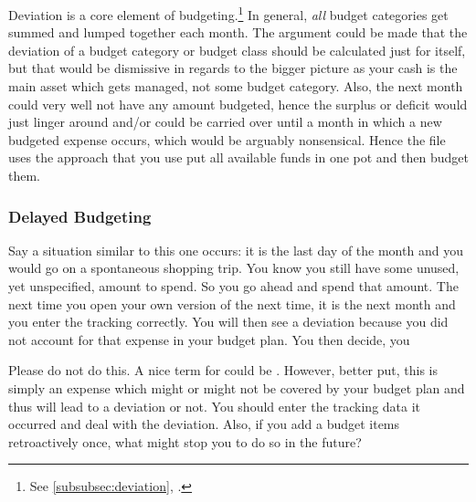 Deviation is a core element of budgeting.\footnote{See \autoref{subsubsec:deviation}, .}
In general, \emph{all} budget categories get summed and lumped together each month.
The argument could be made that the deviation of a budget category or budget class should be calculated just for itself, but that would be dismissive in regards to the bigger picture as your cash is the main asset which gets managed, not some budget category.
Also, the next month could very well not have any amount budgeted, hence the surplus or deficit would just linger around and/or could be carried over until a month in which a new budgeted expense occurs, which would be arguably nonsensical.
Hence the file uses the approach that you use put all available funds in one pot and then budget them.

\subsubsection{Delayed Budgeting}
\label{subsubsec:delayed-budgeting}

Say a situation similar to this one occurs:
it is the last day of the month and you would go on a spontaneous shopping trip.
You know you still have some unused, yet unspecified, amount to spend.
So you go ahead and spend that amount.
The next time you open your own version of \tfn the next time, it is the next month and you enter the tracking correctly.
You will then see a deviation because you did not account for that expense in your budget plan.
You then decide, you 

Please do not do this.
A nice term for could be .
However, better put, this is simply an expense which might or might not be covered by your budget plan and thus will lead to a deviation or not.
You should enter the tracking data it occurred and deal with the deviation.
Also, if you add a budget items retroactively once, what might stop you to do so in the future?